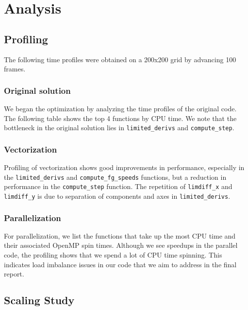 \documentclass[11pt]{article}
\begin{document}
\section{Analysis}
\subsection{Profiling} \label{sec:prof}

The following time profiles were obtained on a 200x200 grid by advancing 100 frames. 

\subsubsection{Original solution}
We began the optimization by analyzing the time profiles of the original code. The following table shows the top 4 functions by CPU time. We note that the bottleneck in the original solution lies in \texttt{limited\_derivs} and \texttt{compute\_step}.


\subsubsection{Vectorization}
Profiling of vectorization shows good improvements in performance, especially in the \texttt{limited\_derivs} and \texttt{compute\_fg\_speeds} functions, but a reduction in performance in the \texttt{compute\_step} function. The repetition of \texttt{limdiff\_x} and \texttt{limdiff\_y} is due to separation of components and axes in \texttt{limited\_derivs}. 


\subsubsection{Parallelization}
For parallelization, we list the functions that take up the most CPU time and their associated OpenMP spin times. Although we see speedups in the parallel code, the profiling shows that we spend a lot of CPU time spinning. This indicates load imbalance issues in our code that we aim to address in the final report. 



\subsection{Scaling Study} \label{sec:speedup}
\end{document}
